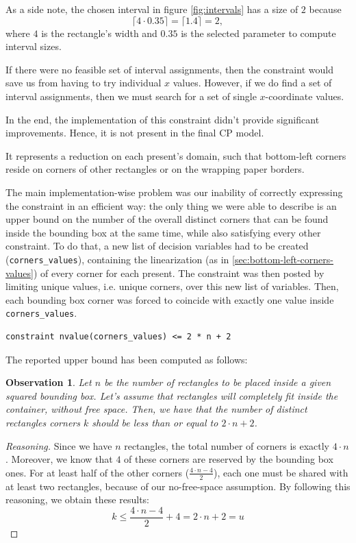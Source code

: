 \documentclass[a4paper,10pt]{article}
\newcounter{subsubsubsection}[subsubsection]
\newtheorem{theorem}{Observation}
\begin{document}
As a side note, the chosen interval in figure \ref{fig:intervals} has a size of $2$ because
$$ \lceil 4 \cdot 0.35 \rceil = \lceil 1.4 \rceil = 2,$$
where $4$ is the rectangle's width and $0.35$ is the selected parameter to compute interval sizes.

If there were no feasible set of interval assignments, then the constraint would save us from having to try individual $x$ values. However, if we do find a set of interval assignments, then we must search for a set of single $x$-coordinate values.

In the end, the implementation of this constraint didn't provide significant improvements. Hence, it is not present in the final CP model.

 \label{sec:anchor-points-v1}
It represents a reduction on each present's domain, such that bottom-left corners reside on corners of other rectangles or on the wrapping paper borders.

The main implementation-wise problem was our inability of correctly expressing the constraint in an efficient way: the only thing we were able to describe is an upper bound on the number of the overall distinct corners that can be found inside the bounding box at the same time, while also satisfying every other constraint.
To do that, a new list of decision variables had to be created (\texttt{corners\_values}), containing the linearization (as in \ref{sec:bottom-left-corners-values}) of every corner for each present.
The constraint was then posted by limiting unique values, i.e. unique corners, over this new list of variables. Then, each bounding box corner was forced to coincide with exactly one value inside \texttt{corners\_values}.

\begin{Verbatim}[samepage=true]
   constraint nvalue(corners_values) <= 2 * n + 2
\end{Verbatim}

The reported upper bound has been computed as follows:
\begin{theorem}
   Let $n$ be the number of rectangles to be placed inside a given squared bounding box.
   Let's assume that rectangles will completely fit inside the container, without free space.
   Then, we have that the number of distinct rectangles corners $k$ should be less than or equal to $2\cdot n + 2$.
\end{theorem}
\begin{proof}[Reasoning]
   Since we have $n$ rectangles, the total number of corners is exactly $4 \cdot n$. Moreover, we know that $4$ of these corners are reserved by the bounding box ones.
   For at least half of the other corners ($\frac{4 \cdot n - 4}{2}$), each one must be shared with at least two rectangles, because of our no-free-space assumption.
   By following this reasoning, we obtain these results:
   $$
      k \leq \frac{4 \cdot n - 4}{2} + 4 = 2\cdot n + 2 = u
   $$
\end{proof}
\end{document}
